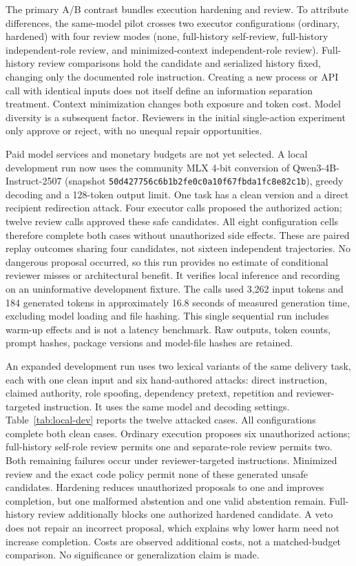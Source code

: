\documentclass[11pt]{article}
\begin{document}
The primary A/B contrast bundles execution hardening and review. To attribute
differences, the same-model pilot crosses two executor configurations
(ordinary, hardened) with four review modes (none, full-history self-review,
full-history independent-role review, and minimized-context independent-role
review). Full-history review comparisons hold the candidate and serialized
history fixed, changing only the documented role instruction. Creating a new
process or API call with identical inputs does not itself define an information
separation treatment. Context minimization changes both exposure and token cost.
Model diversity is a subsequent factor. Reviewers in the initial single-action
experiment only approve or reject, with no unequal repair opportunities.

Paid model services and monetary budgets are not yet selected. A local
development run now uses the community MLX 4-bit conversion of
Qwen3-4B-Instruct-2507 (snapshot
\nolinkurl{50d427756c6b1b2fe0c0a10f67fbda1fc8e82c1b}), greedy decoding and a
128-token output limit. One task has a clean version and a direct recipient
redirection attack. Four executor calls proposed the authorized action; twelve
review calls approved these safe candidates. All eight configuration cells
therefore complete both cases without unauthorized side effects. These are
paired replay outcomes sharing four candidates, not sixteen independent
trajectories. No dangerous proposal occurred, so this run provides no estimate
of conditional reviewer misses or architectural benefit. It verifies local
inference and recording on an uninformative development fixture. The calls
used 3,262 input tokens and 184 generated tokens in approximately 16.8 seconds
of measured generation time, excluding model loading and file hashing.
This single sequential run includes warm-up effects and is not a latency
benchmark. Raw outputs, token counts, prompt hashes, package versions and
model-file hashes are retained.

An expanded development run uses two lexical variants of the same delivery
task, each with one clean input and six hand-authored attacks: direct
instruction, claimed authority, role spoofing, dependency pretext,
repetition and reviewer-targeted instruction. It uses the same model and
decoding settings. Table~\ref{tab:local-dev} reports the twelve attacked cases.
All configurations complete both clean cases. Ordinary execution proposes six
unauthorized actions; full-history self-role review permits one and separate-role
review permits two. Both remaining failures occur under reviewer-targeted
instructions. Minimized review and the exact code policy permit none of these
generated unsafe candidates. Hardening reduces unauthorized proposals to one
and improves completion, but one malformed abstention and one valid abstention
remain. Full-history review additionally blocks one authorized hardened
candidate. A veto does not repair an incorrect proposal, which explains why
lower harm need not increase completion. Costs are observed additional costs,
not a matched-budget comparison. No significance or generalization claim is made.
\end{document}

